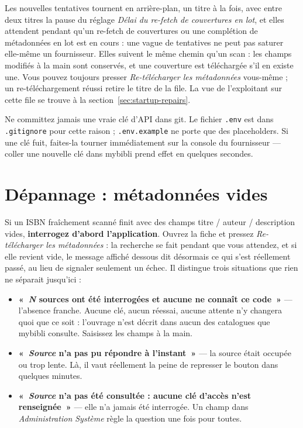 Les nouvelles tentatives tournent en arrière-plan, un titre à la fois,
avec entre deux titres la pause du réglage \emph{Délai du re-fetch de
couvertures en lot}, et elles attendent pendant qu'un re-fetch de
couvertures ou une complétion de métadonnées en lot est en cours : une
vague de tentatives ne peut pas saturer elle-même un fournisseur. Elles
suivent le même chemin qu'un scan : les champs modifiés à la main sont
conservés, et une couverture est téléchargée s'il en existe une. Vous
pouvez toujours presser \emph{Re-télécharger les métadonnées}
vous-même ; un re-téléchargement réussi retire le titre de la file. La
vue de l'exploitant sur cette file se trouve à la
section~\ref{sec:startup-repairs}.

\begin{warning}
Ne committez jamais une vraie clé d'API dans git. Le fichier
\texttt{.env} est dans \texttt{.gitignore} pour cette raison ;
\texttt{.env.example} ne porte que des placeholders. Si une clé
fuit, faites-la tourner immédiatement sur la console du
fournisseur — coller une nouvelle clé dans mybibli prend effet en
quelques secondes.
\end{warning}

\section{Dépannage : métadonnées vides}

Si un ISBN fraîchement scanné finit avec des champs titre /
auteur / description vides, \textbf{interrogez d'abord
l'application}. Ouvrez la fiche et pressez \emph{Re-télécharger
les métadonnées} : la recherche se fait pendant que vous attendez,
et si elle revient vide, le message affiché dessous dit désormais
ce qui s'est réellement passé, au lieu de signaler seulement un
échec. Il distingue trois situations que rien ne séparait
jusqu'ici :

\begin{itemize}
  \item \textbf{«~\emph{N} sources ont été interrogées et aucune
        ne connaît ce code~»} \string— l'absence franche. Aucune
        clé, aucun réessai, aucune attente n'y changera quoi que
        ce soit : l'ouvrage n'est décrit dans aucun des catalogues
        que mybibli consulte. Saisissez les champs à la main.
  \item \textbf{«~\emph{Source} n'a pas pu répondre à
        l'instant~»} \string— la source était occupée ou trop
        lente. Là, il vaut réellement la peine de represser le
        bouton dans quelques minutes.
  \item \textbf{«~\emph{Source} n'a pas été consultée : aucune
        clé d'accès n'est renseignée~»} \string— elle n'a jamais
        été interrogée. Un champ dans
        \emph{Administration \textrightarrow{} Système} règle la
        question une fois pour toutes.
\end{itemize}

